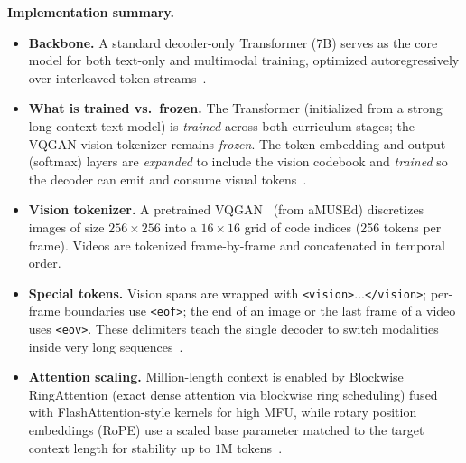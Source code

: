 \begin{enrichment}
\begin{enrichment}
        \textbf{Implementation summary.}
        \begin{itemize}
            \item \textbf{Backbone.} A standard decoder-only Transformer (7B) serves as the core model for both text-only and multimodal training, optimized autoregressively over interleaved token streams~\cite{liu2025_lwm}.
            \item \textbf{What is trained vs.\ frozen.} The Transformer (initialized from a strong long-context text model) is \emph{trained} across both curriculum stages; the VQGAN vision tokenizer remains \emph{frozen}. The token embedding and output (softmax) layers are \emph{expanded} to include the vision codebook and \emph{trained} so the decoder can emit and consume visual tokens~\cite[Sec.~4]{liu2025_lwm}.
            \item \textbf{Vision tokenizer.} A pretrained VQGAN~\cite{esser2021_vqgan} (from aMUSEd) discretizes images of size \(256{\times}256\) into a \(16{\times}16\) grid of code indices (256 tokens per frame). Videos are tokenized frame-by-frame and concatenated in temporal order.
            \item \textbf{Special tokens.} Vision spans are wrapped with \texttt{<vision>}...\texttt{</vision>}; per-frame boundaries use \texttt{<eof>}; the end of an image or the last frame of a video uses \texttt{<eov>}. These delimiters teach the single decoder to switch modalities inside very long sequences~\cite[Sec.~4]{liu2025_lwm}.
            \item \textbf{Attention scaling.} Million-length context is enabled by Blockwise RingAttention (exact dense attention via blockwise ring scheduling) fused with FlashAttention-style kernels for high MFU, while rotary position embeddings (RoPE) use a scaled base parameter matched to the target context length for stability up to \(1\)M tokens~\cite[Sec.~3.1]{liu2025_lwm}.
            
            \newpage
            

\end{itemize}
\end{enrichment}
\end{enrichment}
